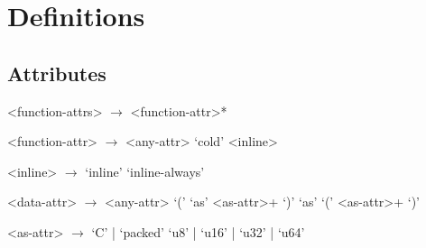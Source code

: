 \section{Definitions}\label{sec:def}

\subsection{Attributes}\label{sub:attr}
\begin{grammar}
<function-attrs> $\to$ \lit{\#(} <function-attr>* \lit{)}

<function-attr> $\to$ <any-attr>
                 \alt `cold'
                 \alt <inline>

<inline> $\to$ `inline'
          \alt `inline-always'

<data-attr> $\to$ <any-attr>
            \alt `(' `as' <as-attr>+ `)'
            \alt `as' `(' <as-attr>+ `)'

<as-attr> $\to$ `C' | `packed'
          \alt `u8' | `u16' | `u32' | `u64'
\end{grammar}
